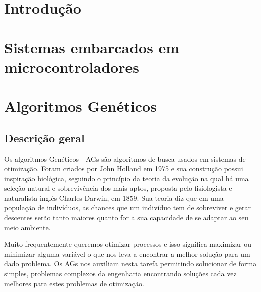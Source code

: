 \documentclass[
    12pt,               %
    twoside,            %
    a4paper,            %
    english,            %
    french,             %
    spanish,            %
    brazil,             %
    ]{abntex2}
\begin{document}
\textual

\chapter*[Introdução]{Introdução}


\chapter{Sistemas embarcados em microcontroladores}

\chapter{Algoritmos Genéticos}

\section{Descrição geral}

  Os algoritmos Genéticos  - AGs  são algoritmos de busca usados em sistemas de otimização. Foram criados por John Holland em 1975  e sua construção possui inspiração biológica, seguindo o princípio da teoria da evolução na qual há uma seleção natural e sobrevivência dos mais aptos, proposta pelo fisiologista e naturalista inglês Charles Darwin, em 1859. Sua teoria diz que em uma população de indivíduos, as chances que um indivíduo tem de sobreviver e gerar descentes serão tanto maiores quanto for a sua capacidade de se adaptar ao seu meio ambiente.

  Muito frequentemente queremos otimizar processos e isso significa maximizar ou minimizar alguma variável o que nos leva a encontrar a melhor solução para um dado problema.  Os AGs nos auxiliam nesta tarefa permitindo solucionar de forma simples, problemas complexos da engenharia encontrando soluções cada vez melhores para estes problemas de otimização.
\end{document}
